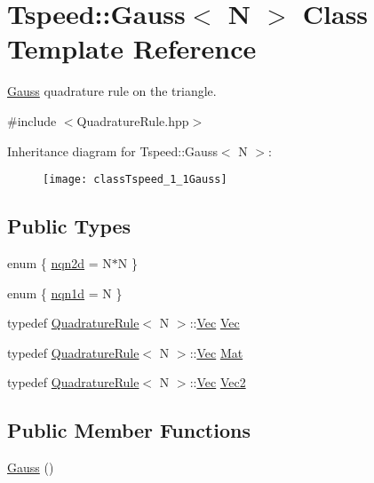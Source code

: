 \hypertarget{classTspeed_1_1Gauss}{\section{Tspeed\-:\-:Gauss$<$ N $>$ Class Template Reference}
\label{classTspeed_1_1Gauss}
}


\hyperlink{classTspeed_1_1Gauss}{Gauss} quadrature rule on the triangle.  




{\ttfamily \#include $<$Quadrature\-Rule.\-hpp$>$}

Inheritance diagram for Tspeed\-:\-:Gauss$<$ N $>$\-:\begin{figure}[H]
\begin{center}
\leavevmode
\texttt{[image: classTspeed\_1\_1Gauss]}
\end{center}
\end{figure}
\subsection*{Public Types}
\begin{DoxyCompactItemize}
\item 
enum \{ \hyperlink{classTspeed_1_1Gauss_a91d11e695996fb9038422fdd0d3065aaa13cac1428f86f136e6ed539e3eba50c1}{nqn2d} = N$\ast$\-N
 \}
\item 
enum \{ \hyperlink{classTspeed_1_1Gauss_a501ad3412838918f9e2301655f64eafeadbbfd28e9b0adcf7dfae2dd2b344ff62}{nqn1d} = N
 \}
\item 
typedef \hyperlink{classTspeed_1_1QuadratureRule}{Quadrature\-Rule}$<$ N $>$\-::\hyperlink{classTspeed_1_1QuadratureRule_a195c2b71ad957c9dc5408452b11e1302}{Vec} \hyperlink{classTspeed_1_1Gauss_aa7e6ce3b329db121166dc94669eeb64c}{Vec}
\item 
typedef \hyperlink{classTspeed_1_1QuadratureRule}{Quadrature\-Rule}$<$ N $>$\-::\hyperlink{classTspeed_1_1QuadratureRule_a195c2b71ad957c9dc5408452b11e1302}{Vec} \hyperlink{classTspeed_1_1Gauss_a60a04af13bc0e53cfae47226d1d3e6c2}{Mat}
\item 
typedef \hyperlink{classTspeed_1_1QuadratureRule}{Quadrature\-Rule}$<$ N $>$\-::\hyperlink{classTspeed_1_1QuadratureRule_a195c2b71ad957c9dc5408452b11e1302}{Vec} \hyperlink{classTspeed_1_1Gauss_ae0f9176585d652260498c0b142b183eb}{Vec2}
\end{DoxyCompactItemize}
\subsection*{Public Member Functions}
\begin{DoxyCompactItemize}
\item 
\hyperlink{classTspeed_1_1Gauss_a0bcffd5c12cefd767a96a597c3c250ce}{Gauss} ()
\end{DoxyCompactItemize}
